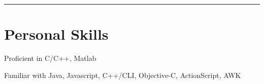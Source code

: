 \documentclass[letterpaper]{article}
\renewenvironment{itemize}{
  \begin{list}{}{
    \setlength{\leftmargin}{1.5em}
    \setlength{\itemsep}{0pt}
  }
}{
  \end{list}
}
\begin{document}
\rule{16.8cm}{0.1em}

\vspace{-1.5em}
\section*{Personal Skills}
\begin{itemize}
\item Proficient in C/C++, Matlab
\item Familiar with Java, Javascript, C++/CLI, Objective-C, ActionScript, AWK
%
%
\end{itemize}
\end{document}
